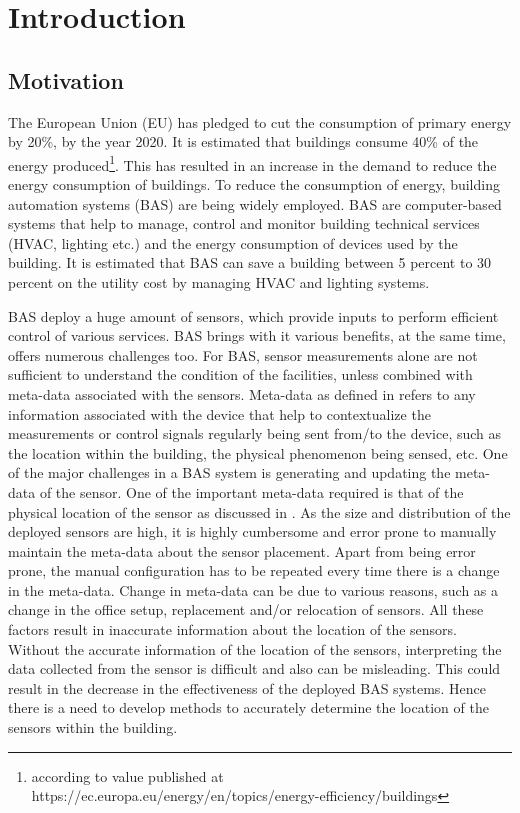 \chapter{Introduction}
\label{chp:introduction}
\section{Motivation}
The European Union (EU) has pledged to cut the consumption of primary energy by 20\%, by the year 2020.  It is estimated that buildings consume 40\% of the energy produced\footnote{according to value published at https://ec.europa.eu/energy/en/topics/energy-efficiency/buildings }.  This has resulted in an increase in the demand to reduce the energy consumption of buildings. To reduce the consumption of energy, building automation systems (BAS) are being widely employed. BAS are computer-based systems that help to manage, control and monitor building technical services (HVAC, lighting etc.) and the energy consumption of devices used by the building. It is estimated that BAS can save a building between 5 percent to 30 percent on the utility cost by managing HVAC and lighting systems\cite{bas}.

BAS deploy a huge amount of sensors, which provide inputs to perform efficient control of various services. BAS brings with it various benefits, at the same time, offers numerous challenges too. For BAS, sensor measurements alone are not sufficient to understand the condition of the facilities, unless combined with meta-data associated with the sensors.
Meta-data as defined in \cite{gao2015data} refers to any information associated  with the device that help to contextualize the measurements or control signals regularly being sent from/to the device, such as the location within the building, the physical phenomenon being sensed, etc. One of the major challenges in a BAS system is generating and updating the meta-data of the sensor.
One of the important meta-data required is that of the physical location of the sensor as discussed in  \cite{liu2009requirements}.
As the size and distribution of the deployed sensors are high, it is highly cumbersome and error prone to manually maintain the meta-data about the sensor placement. Apart from being error prone, the manual configuration has to be repeated every time there is a change in the meta-data. Change in meta-data can be due to various reasons, such as a change in the office setup, replacement and/or relocation of sensors. All these factors result in inaccurate information about the location of the sensors. Without the accurate information of the location of the sensors, interpreting the data collected from the sensor is difficult and also can be misleading. This could result in the decrease in the effectiveness of the deployed BAS systems. Hence there is a need to develop methods to accurately determine the location of the sensors within the building.
